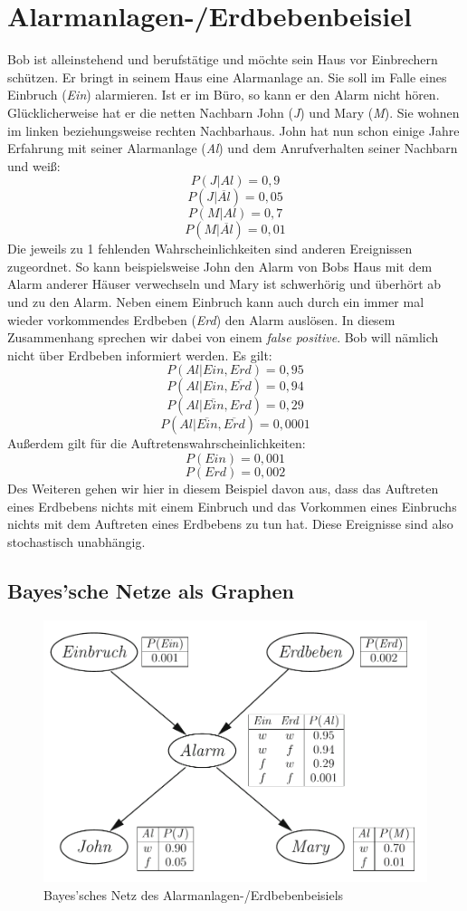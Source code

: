\section{Alarmanlagen-/Erdbebenbeisiel}
Bob ist alleinstehend und berufstätige und möchte sein Haus vor Einbrechern schützen. Er bringt in seinem Haus eine Alarmanlage an. Sie soll im Falle eines Einbruch (\textit{Ein}) alarmieren. Ist er im Büro, so kann er den Alarm nicht hören. Glücklicherweise hat er die netten Nachbarn John (\textit{J}) und Mary (\textit{M}). Sie wohnen im linken beziehungsweise rechten Nachbarhaus. John hat nun schon einige Jahre Erfahrung mit seiner Alarmanlage (\textit{Al}) und dem Anrufverhalten seiner Nachbarn und weiß: 
\[ P(J\vert Al) = 0,9\] 
\[ P(J\vert \overline{Al}) = 0,05\]
\[ P(M\vert Al) = 0,7\]
\[ P(M\vert \overline{Al} ) = 0,01\]
Die jeweils zu 1 fehlenden Wahrscheinlichkeiten sind anderen Ereignissen zugeordnet. So kann beispielsweise John den Alarm von Bobs Haus mit dem Alarm anderer Häuser verwechseln und Mary ist schwerhörig und überhört ab und zu den Alarm. 
Neben einem Einbruch kann auch durch ein immer mal wieder vorkommendes Erdbeben (\textit{Erd}) den Alarm auslösen. In diesem Zusammenhang sprechen wir dabei von einem \textit{false positive}. Bob will nämlich nicht über Erdbeben informiert werden. Es gilt:
\[ P(Al\vert Ein, Erd) = 0,95\] 
\[ P(Al\vert Ein,\overline{Erd}) = 0,94\]
\[ P(Al\vert \overline{Ein}, Erd) = 0,29\]
\[ P(Al\vert \overline{Ein}, \overline{Erd})  = 0,0001\]
Außerdem gilt für die Auftretenswahrscheinlichkeiten: 
\[ P(Ein) = 0,001\]
\[ P(Erd) = 0,002\]
Des Weiteren gehen wir hier in diesem Beispiel davon aus, dass das Auftreten eines Erdbebens nichts mit einem Einbruch und das Vorkommen eines Einbruchs nichts mit dem Auftreten eines Erdbebens zu tun hat. Diese Ereignisse sind also stochastisch unabhängig.   
\subsection{Bayes'sche Netze als Graphen}


\begin{figure}%
\includegraphics[scale=0.3]{bilder/bspNetz} 
\caption{Bayes'sches Netz des Alarmanlagen-/Erdbebenbeisiels \cite{Ertel16}}
\label{Agenten}
\end{figure}


